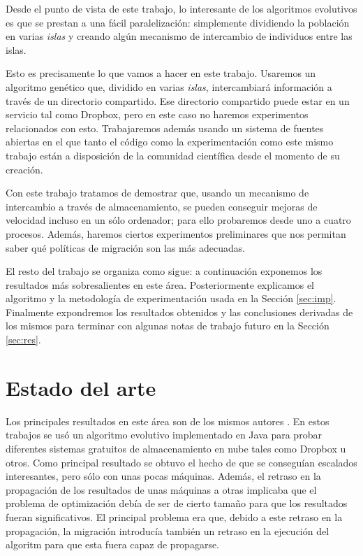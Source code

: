 \documentclass{article}
\begin{document}
Desde el punto de vista de este trabajo, lo interesante de los
algoritmos evolutivos es que se prestan a una fácil paralelización:
simplemente dividiendo la población en varias {\em islas} y creando  %
algún mecanismo de intercambio de individuos entre las islas.

Esto es precisamente lo que vamos a hacer en este trabajo. Usaremos un
algoritmo genético  que, dividido en varias {\em islas}, intercambiará
información a través de un directorio compartido. Ese directorio
compartido puede estar en un servicio tal como Dropbox, pero en este
caso no haremos experimentos relacionados con esto.   %
Trabajaremos además usando un sistema de fuentes abiertas en el que tanto el código
como la experimentación como este mismo trabajo están a disposición
de la comunidad científica desde el momento de su creación.  %

Con este trabajo tratamos de demostrar que, usando un mecanismo de
intercambio a través de almacenamiento, se pueden conseguir mejoras de velocidad incluso en un
sólo ordenador; para ello probaremos desde uno a cuatro
procesos. Además, haremos ciertos experimentos preliminares que nos
permitan saber qué políticas de migración son las más adecuadas.

El resto del trabajo se organiza como sigue: a continuación exponemos
los resultados más sobresalientes en este área. Posteriormente
explicamos el algoritmo y la metodología de experimentación
usada en la Sección \ref{sec:imp}. Finalmente expondremos los resultados obtenidos y las
conclusiones derivadas de los mismos para terminar con algunas notas
de trabajo futuro en la Sección \ref{sec:res}. 


\section{Estado del arte}

Los principales resultados en este área son de los mismos autores
\cite{DBLP:conf/cec/ArenasGMCRL11,DBLP:conf/gecco/ArenasGCLRM11,mericloud}. En   %
estos trabajos se usó un algoritmo evolutivo implementado en Java para
probar diferentes sistemas gratuitos de almacenamiento en nube tales
como Dropbox u otros. Como principal resultado se obtuvo el hecho de
que se conseguían escalados interesantes, pero sólo con unas pocas
máquinas. Además, el retraso en la propagación de los resultados de
unas máquinas a otras implicaba que el problema de optimización debía
de ser de cierto tamaño para que los resultados fueran
significativos. El principal problema era que, debido a este retraso
en la propagación, la migración introducía también un retraso en la
ejecución del algoritm para que esta fuera capaz de propagarse. 
\end{document}
